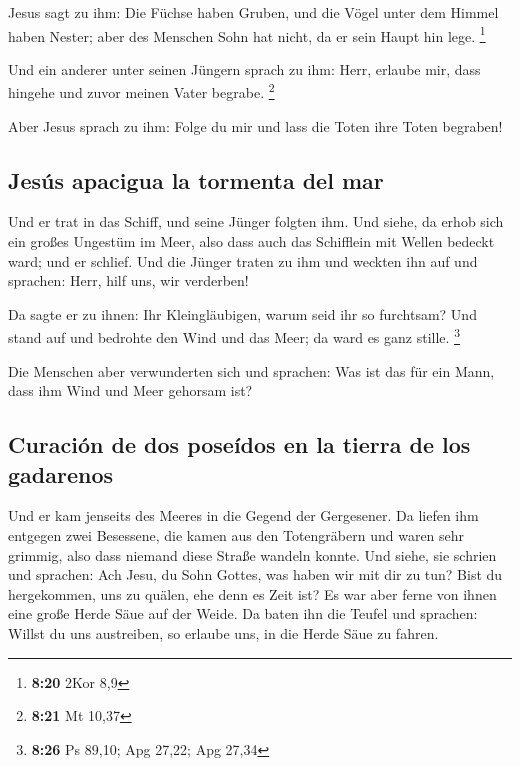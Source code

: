  Jesus sagt zu ihm: Die Füchse haben Gruben, und die
Vögel unter dem Himmel haben Nester; aber des Menschen Sohn hat nicht,
da er sein Haupt hin lege. \footnote{\textbf{8:20} 2Kor 8,9}

 Und ein anderer unter seinen Jüngern sprach zu ihm:
Herr, erlaube mir, dass hingehe und zuvor meinen Vater begrabe.
\footnote{\textbf{8:21} Mt 10,37}

 Aber Jesus sprach zu ihm: Folge du mir und lass die
Toten ihre Toten begraben!

\hypertarget{jesuxfas-apacigua-la-tormenta-del-mar}{%
\subsection{Jesús apacigua la tormenta del
mar}\label{jesuxfas-apacigua-la-tormenta-del-mar}}

 Und er trat in das Schiff, und seine Jünger folgten ihm.
 Und siehe, da erhob sich ein großes Ungestüm im Meer,
also dass auch das Schifflein mit Wellen bedeckt ward; und er schlief.
 Und die Jünger traten zu ihm und weckten ihn auf und
sprachen: Herr, hilf uns, wir verderben!

 Da sagte er zu ihnen: Ihr Kleingläubigen, warum seid ihr
so furchtsam? Und stand auf und bedrohte den Wind und das Meer; da ward
es ganz stille. \footnote{\textbf{8:26} Ps 89,10; Apg 27,22; Apg 27,34}

 Die Menschen aber verwunderten sich und sprachen: Was
ist das für ein Mann, dass ihm Wind und Meer gehorsam ist?

\hypertarget{curaciuxf3n-de-dos-poseuxeddos-en-la-tierra-de-los-gadarenos}{%
\subsection{Curación de dos poseídos en la tierra de los
gadarenos}\label{curaciuxf3n-de-dos-poseuxeddos-en-la-tierra-de-los-gadarenos}}

 Und er kam jenseits des Meeres in die Gegend der
Gergesener. Da liefen ihm entgegen zwei Besessene, die kamen aus den
Totengräbern und waren sehr grimmig, also dass niemand diese Straße
wandeln konnte.  Und siehe, sie schrien und sprachen: Ach
Jesu, du Sohn Gottes, was haben wir mit dir zu tun? Bist du hergekommen,
uns zu quälen, ehe denn es Zeit ist?  Es war aber ferne
von ihnen eine große Herde Säue auf der Weide.  Da baten
ihn die Teufel und sprachen: Willst du uns austreiben, so erlaube uns,
in die Herde Säue zu fahren.

